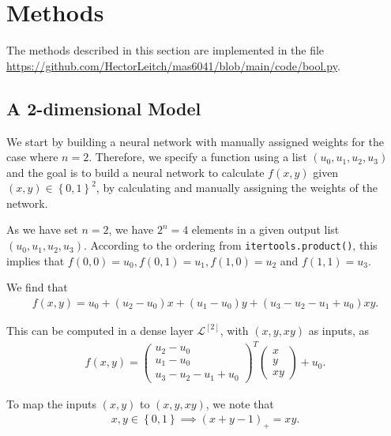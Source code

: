 \documentclass{somasmsc}
\begin{document}
\section{Methods}

The methods described in this section are implemented in the file \url{https://github.com/HectorLeitch/mas6041/blob/main/code/bool.py}.

\subsection{A 2-dimensional Model}\label{bool:2d}

We start by building a neural network with manually assigned weights for the case where $n=2$. Therefore, we specify a function using a list $\left(u_0, u_1, u_2, u_3\right)$ and the goal is to build a neural network to calculate $f(x, y)$ given $\left(x, y\right) \in \left\{0, 1\right\}^2$, by calculating and manually assigning the weights of the network.

As we have set $n=2$, we have $2^n = 4$ elements in a given output list $\left(u_0, u_1, u_2, u_3\right)$. According to the ordering from \verb|itertools.product()|, this implies that $f(0, 0) = u_0, f(0, 1) = u_1, f(1, 0) = u_2$ and $f(1, 1) = u_3$.

We find that
\begin{align} \label{bool:eq1}
f(x, y) = u_0 + \left(u_2 - u_0\right)x + \left(u_1 - u_0\right)y + \left(u_3 - u_2 - u_1 + u_0\right)xy. 
\end{align}

This can be computed in a dense layer $\mathcal{L}^{\left[2\right]}$, with $\left(x, y, xy\right)$ as inputs, as
\begin{align} \label{bool:eq2}
f(x, y) =
\begin{pmatrix}
    u_2 - u_0 \\
    u_1 - u_0 \\
    u_3 - u_2 - u_1 + u_0
\end{pmatrix}^T
\begin{pmatrix}
    x \\
    y\\
    xy
\end{pmatrix}
+ u_0.
\end{align}

To map the inputs $\left(x, y\right)$ to $\left(x, y, xy\right)$, we note that
\begin{align} \label{bool:eq3}
x, y \in \left\{0, 1\right\} \implies \left(x + y - 1\right)_+ = xy.
\end{align}
\end{document}

